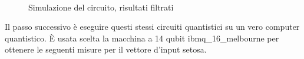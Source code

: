 \begin{figure}[h]
    \myfloatalign
     \\
    \caption{Simulazione del circuito, risultati filtrati}
    \label{fig:simulazione_filtrati}
\end{figure}

Il passo successivo è eseguire questi stessi circuiti quantistici su un vero computer quantistico. 
È usata scelta la macchina a 14 qubit ibmq\_16\_melbourne per ottenere le seguenti misure per il vettore d'input 
setosa. 

